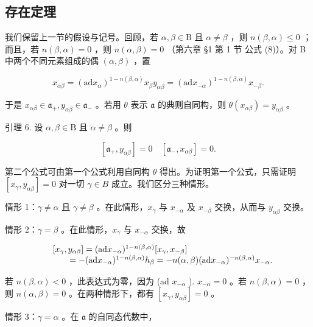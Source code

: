 \subsection{存在定理}

我们保留上一节的假设与记号。回顾，若 \(\alpha, \beta \in \mathrm{B}\) 且 \(\alpha \neq \beta\) ，则 \(n(\beta, \alpha) \leq 0\) ；而且，若 \(n(\beta, \alpha) = 0\) ，则 \(n(\alpha, \beta) = 0\) （第六章 §1 第 1 节 公式 (8)）。对 B 中两个不同元素组成的偶 \((\alpha, \beta)\) ，置

\[
x _ {\alpha \beta} = (\mathrm{ad} x _ {\alpha}) ^ {1 - n (\beta , \alpha)} x _ {\beta} y _ {\alpha \beta} = (\mathrm{ad} x _ {- \alpha}) ^ {1 - n (\beta , \alpha)} x _ {- \beta}.
\]

于是 \(x_{\alpha \beta} \in \mathfrak{a}_{+}, y_{\alpha \beta} \in \mathfrak{a}_{-}\) 。若用 \(\theta\) 表示 \(\mathfrak{a}\) 的典则自同构，则 \(\theta(x_{\alpha \beta}) = y_{\alpha \beta}\) 。

引理 6. 设 \(\alpha, \beta \in \mathrm{B}\) 且 \(\alpha \neq \beta\) 。则

\[
[ \mathfrak {a} _ {+}, y _ {\alpha \beta} ] = 0 \quad [ \mathfrak {a} _ {-}, x _ {\alpha \beta} ] = 0.
\]

第二个公式可由第一个公式利用自同构 \(\theta\) 得出。为证明第一个公式，只需证明 \([x_{\gamma}, y_{\alpha \beta}] = 0\) 对一切 \(\gamma \in B\) 成立。我们区分三种情形。

情形 1：\(\gamma \neq \alpha\) 且 \(\gamma \neq \beta\) 。在此情形，\(x_{\gamma}\) 与 \(x_{-\alpha}\) 及 \(x_{-\beta}\) 交换，从而与 \(y_{\alpha \beta}\) 交换。

情形 2：\(\gamma = \beta\) 。在此情形，\(x_{\gamma}\) 与 \(x_{-\alpha}\) 交换，故

\[
\begin{array}{r l} & {[ x _ {\gamma}, y _ {\alpha \beta} ] = (\mathrm{ad} x _ {- \alpha}) ^ {1 - n (\beta , \alpha)} [ x _ {\gamma}, x _ {- \beta} ]} \\ & {\qquad = - (\mathrm{ad} x _ {- \alpha}) ^ {1 - n (\beta , \alpha)} h _ {\beta} = - n (\alpha , \beta) (\mathrm{ad} x _ {- \alpha}) ^ {- n (\beta , \alpha)} x _ {- \alpha}.} \end{array}
\]

若 \(n(\beta, \alpha) < 0\) ，此表达式为零，因为 (ad \(x_{-\alpha}\) ). \(x_{-\alpha} = 0\) 。若 \(n(\beta, \alpha) = 0\) ，则 \(n(\alpha, \beta) = 0\) 。在两种情形下，都有 \([x_{\gamma}, y_{\alpha\beta}] = 0\) 。

情形 3：\(\gamma = \alpha\) 。在 \(\mathfrak{a}\) 的自同态代数中，

